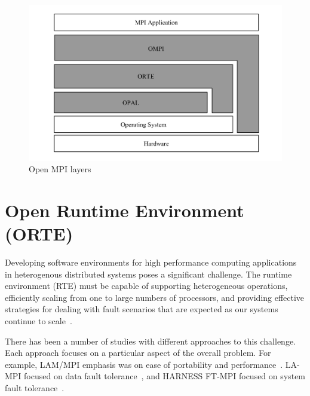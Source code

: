 \begin{figure}[h!]
\centering
\includegraphics[scale=0.5]{images/open-mpi-layers.png}
\caption{Open MPI layers}
\label{fig:open-mpi-layers}
\end{figure}


\section{Open Runtime Environment (ORTE)}
\label{sec:orte}
Developing software environments for high performance computing applications in heterogenous distributed systems poses a significant challenge. The runtime environment (RTE) must be capable of supporting heterogeneous operations, efficiently scaling from one to large numbers of processors, and providing effective strategies for dealing with fault scenarios that are expected as our systems continue to scale~\cite{kronstadt2005peta}.

There has been a number of studies with different approaches to this challenge. Each approach focuses on a particular aspect of the overall problem. For example, LAM/MPI emphasis was on ease of portability and performance~\cite{squyres2004component}. LA-MPI focused on data fault tolerance~\cite{aulwes2004architecture}, and HARNESS FT-MPI focused on system fault tolerance~\cite{fagg2002harness}.

